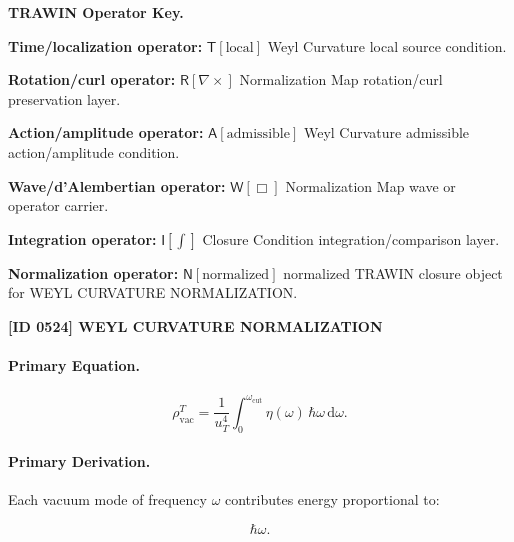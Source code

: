 \par\vspace{0.45\baselineskip}
\noindent\begin{minipage}[t]{\linewidth}
\begingroup
\small
\raggedright
\textbf{TRAWIN Operator Key.}\par
\noindent\textbf{Time/localization operator:} $\mathsf{T}\!\left[\mathrm{local}\right]$ Weyl Curvature local source condition.\par
\noindent\textbf{Rotation/curl operator:} $\mathsf{R}\!\left[\nabla\times\right]$ Normalization Map rotation/curl preservation layer.\par
\noindent\textbf{Action/amplitude operator:} $\mathsf{A}\!\left[\mathrm{admissible}\right]$ Weyl Curvature admissible action/amplitude condition.\par
\noindent\textbf{Wave/d'Alembertian operator:} $\mathsf{W}\!\left[\Box\right]$ Normalization Map wave or operator carrier.\par
\noindent\textbf{Integration operator:} $\mathsf{I}\!\left[\int\right]$ Closure Condition integration/comparison layer.\par
\noindent\textbf{Normalization operator:} $\mathsf{N}\!\left[\mathrm{normalized}\right]$ normalized TRAWIN closure object for WEYL CURVATURE NORMALIZATION.\par
\endgroup
\end{minipage}

\clearpage
\noindent\textbf{[ID 0524] WEYL CURVATURE NORMALIZATION}\par
\vspace{0.35em}
\paragraph{Primary Equation.}
\begin{equation}
\rho_{\mathrm{vac}}^{T}
=
\frac{1}{u_T^4}
\int_{0}^{\omega_{\mathrm{cut}}}
\eta(\omega)\,
\hbar\omega\,
\mathrm{d}\omega .
\end{equation}

\paragraph{Primary Derivation.}
Each vacuum mode of frequency $\omega$ contributes energy proportional to:

\begin{equation}
\hbar\omega .
\end{equation}

